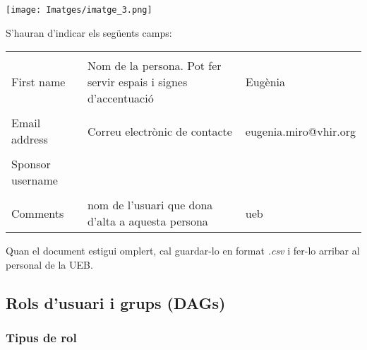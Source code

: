 \documentclass[
]{article}
\begin{document}
\texttt{[image: Imatges/imatge\_3.png]}

S'hauran d'indicar els següents camps:

\begin{table}[!h]
\centering\begingroup\fontsize{13}{15}\selectfont

\begin{tabular}{l|l|l}
\hline
\cellcolor[HTML]{993489}{\textcolor{white}{Camp}} & \cellcolor[HTML]{993489}{\textcolor{white}{Descripció}} & \cellcolor[HTML]{993489}{\textcolor{white}{Exemple}}\\
\hline
\cellcolor{gray!6}{Username} & \cellcolor{gray!6}{Nom de l’usuari. No pot fer servir espais ni signes d’accentuació. Per conveni es fa servir el nom i 1er cognom de l’usuari separats per un punt} & \cellcolor{gray!6}{eugenia.miro}\\
\hline
First name & Nom de la persona. Pot fer servir espais i signes d’accentuació & Eugènia\\
\hline
\cellcolor{gray!6}{Last name} & \cellcolor{gray!6}{Cognom de la persona. Pot fer servir espais i signes d’accentuació} & \cellcolor{gray!6}{Miró}\\
\hline
Email address & Correu electrònic de contacte & eugenia.miro@vhir.org\\
\hline
\cellcolor{gray!6}{Institution ID} & \cellcolor{gray!6}{Nom de la institució a la que pertany aquest usuari} & \cellcolor{gray!6}{HUVH}\\
\hline
Sponsor username &  & \\
\hline
\cellcolor{gray!6}{Expiration} & \cellcolor{gray!6}{} & \cellcolor{gray!6}{}\\
\hline
Comments & nom de l’usuari que dona d’alta a aquesta persona & ueb\\
\hline
\end{tabular}
\endgroup{}
\end{table}

Quan el document estigui omplert, cal guardar-lo en format \emph{.csv} i fer-lo arribar al personal de la UEB.

\hypertarget{rols-dusuari-i-grups-dags}{%
\subsection{\texorpdfstring{\textbf{Rols d'usuari i grups (DAGs)}}{Rols d'usuari i grups (DAGs)}}\label{rols-dusuari-i-grups-dags}}

\hypertarget{en3}{%
\subsubsection{\texorpdfstring{\textbf{Tipus de rol}}{Tipus de rol}}\label{en3}}
\end{document}
